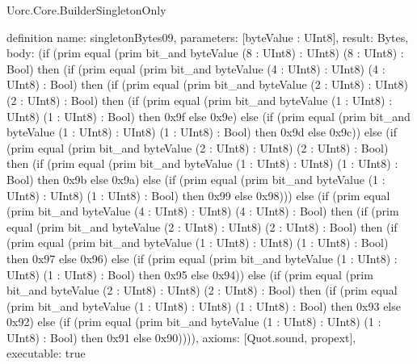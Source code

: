 \begin{lexlean}{Uorc.Core.BuilderSingletonOnly}
\begin{semanticmodule}
definition{
  name: singletonBytes09,
  parameters: [byteValue : UInt8],
  result: Bytes,
  body: (if (prim equal (prim bit_and byteValue (8 : UInt8) : UInt8) (8 : UInt8) : Bool) then (if (prim equal (prim bit_and byteValue (4 : UInt8) : UInt8) (4 : UInt8) : Bool) then (if (prim equal (prim bit_and byteValue (2 : UInt8) : UInt8) (2 : UInt8) : Bool) then (if (prim equal (prim bit_and byteValue (1 : UInt8) : UInt8) (1 : UInt8) : Bool) then 0x9f else 0x9e) else (if (prim equal (prim bit_and byteValue (1 : UInt8) : UInt8) (1 : UInt8) : Bool) then 0x9d else 0x9c)) else (if (prim equal (prim bit_and byteValue (2 : UInt8) : UInt8) (2 : UInt8) : Bool) then (if (prim equal (prim bit_and byteValue (1 : UInt8) : UInt8) (1 : UInt8) : Bool) then 0x9b else 0x9a) else (if (prim equal (prim bit_and byteValue (1 : UInt8) : UInt8) (1 : UInt8) : Bool) then 0x99 else 0x98))) else (if (prim equal (prim bit_and byteValue (4 : UInt8) : UInt8) (4 : UInt8) : Bool) then (if (prim equal (prim bit_and byteValue (2 : UInt8) : UInt8) (2 : UInt8) : Bool) then (if (prim equal (prim bit_and byteValue (1 : UInt8) : UInt8) (1 : UInt8) : Bool) then 0x97 else 0x96) else (if (prim equal (prim bit_and byteValue (1 : UInt8) : UInt8) (1 : UInt8) : Bool) then 0x95 else 0x94)) else (if (prim equal (prim bit_and byteValue (2 : UInt8) : UInt8) (2 : UInt8) : Bool) then (if (prim equal (prim bit_and byteValue (1 : UInt8) : UInt8) (1 : UInt8) : Bool) then 0x93 else 0x92) else (if (prim equal (prim bit_and byteValue (1 : UInt8) : UInt8) (1 : UInt8) : Bool) then 0x91 else 0x90)))),
  axioms: [Quot.sound, propext],
  executable: true
}


\end{semanticmodule}
\end{lexlean}
